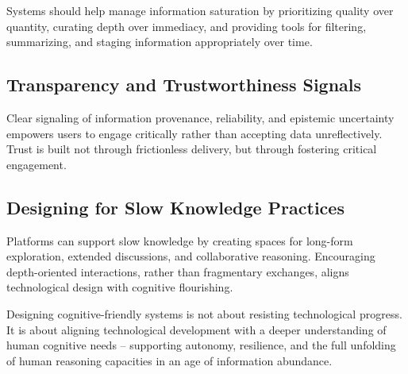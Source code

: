 Systems should help manage information saturation by prioritizing
quality over quantity, curating depth over immediacy, and providing
tools for filtering, summarizing, and staging information appropriately
over time.

\subsection{Transparency and Trustworthiness Signals}

Clear signaling of information provenance, reliability, and epistemic
uncertainty empowers users to engage critically rather than accepting
data unreflectively. Trust is built not through frictionless delivery,
but through fostering critical engagement.

\subsection{Designing for Slow Knowledge Practices}

Platforms can support slow knowledge by creating spaces for long-form
exploration, extended discussions, and collaborative reasoning.
Encouraging depth-oriented interactions, rather than fragmentary
exchanges, aligns technological design with cognitive flourishing.

Designing cognitive-friendly systems is not about resisting
technological progress. It is about aligning technological development
with a deeper understanding of human cognitive needs -- supporting
autonomy, resilience, and the full unfolding of human reasoning
capacities in an age of information abundance.

